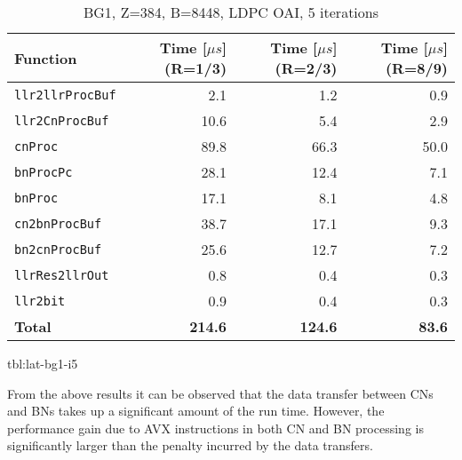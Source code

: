 \documentclass{article}
\begin{document}
\begin{table}[ht]
  \centering
  \begin{tabular}{lrrr}
    \toprule
    \textbf{Function} &  \textbf{Time [$\mu s$] (R=1/3)} & \textbf{Time [$\mu s$] (R=2/3)} & \textbf{Time [$\mu s$] (R=8/9)}\\
    \midrule
    \texttt{llr2llrProcBuf}  & 2.1  & 1.2  & 0.9  \\
    \texttt{llr2CnProcBuf}   & 10.6 & 5.4  & 2.9  \\
    \texttt{cnProc}          & 89.8 & 66.3 & 50.0 \\
    \texttt{bnProcPc}        & 28.1 & 12.4 & 7.1 \\
    \texttt{bnProc}          & 17.1 & 8.1  & 4.8 \\
    \texttt{cn2bnProcBuf}    & 38.7 & 17.1 & 9.3 \\
    \texttt{bn2cnProcBuf}    & 25.6 & 12.7 & 7.2 \\
    \texttt{llrRes2llrOut}   & 0.8  & 0.4  & 0.3 \\
    \texttt{llr2bit}         & 0.9  & 0.4  & 0.3 \\
    \midrule
    \textbf{Total}           & \textbf{214.6} & \textbf{124.6} & \textbf{83.6}\\
    \bottomrule
  \end{tabular}
  \caption{BG1, Z=384, B=8448, LDPC OAI, 5 iterations}
\end{table}{tbl:lat-bg1-i5}

From the above results it can be observed that the data transfer between CNs and BNs takes up a significant amount of the run time. However, the performance gain due to AVX instructions in both CN and BN processing is significantly larger than the penalty incurred by the data transfers.
\end{document}
